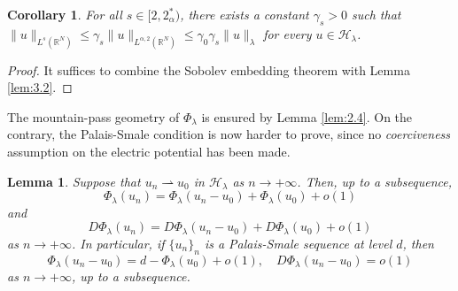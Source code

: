 \documentclass[11pt]{amsart}
\numberwithin{equation}{section}
\newtheorem{lemma}[theorem]{Lemma}
\newtheorem{corollary}[theorem]{Corollary}
\theoremstyle{remark}
\theoremstyle{definition}
\begin{document}
\begin{corollary}
	For all $s \in [2,2_\alpha^*)$, there exists a constant $\gamma_s >0$ such that $\|u\|_{L^s(\mathbb{R}^N)} \leqslant \gamma_s \|u\|_{L^{\alpha,2}(\mathbb{R}^N)}\leqslant \gamma_0 \gamma_s \|u\|_\lambda$ for every $u \in \mathscr{H}_\lambda$. 
\end{corollary}
\begin{proof}
 It suffices to combine the Sobolev embedding theorem with Lemma \ref{lem:3.2}.	
\end{proof}
The mountain-pass geometry of $\Phi_\lambda$ is ensured by Lemma \ref{lem:2.4}. On the contrary, the Palais-Smale condition is now harder to prove, since no \emph{coerciveness} assumption on the electric potential has been made.		
%
\begin{lemma}
	Suppose that $u_n \rightharpoonup u_0$ in $\mathscr{H}_\lambda$ as $n \to +\infty$. Then, up to a subsequence,
	\begin{equation} \label{eq:3.1}
		\Phi_\lambda(u_n) = \Phi_\lambda (u_n-u_0) + \Phi_\lambda(u_0)+o(1)
	\end{equation}
	and
	\begin{equation}\label{eq:3.2}
	D\Phi_\lambda(u_n) = D\Phi_\lambda (u_n-u_0) + D\Phi_\lambda(u_0)+o(1)	
	\end{equation}
	as $n \to +\infty$. In particular, if $\{u_n\}_n$ is a Palais-Smale sequence at level $d$, then
	\begin{equation}\label{eq:3.3}
	\Phi_\lambda(u_n-u_0) = d-\Phi_\lambda(u_0) +o(1), \quad D\Phi_\lambda(u_n-u_0) = o(1)
	\end{equation}
	as $n \to +\infty$, up to a subsequence.
\end{lemma}
\end{document}
